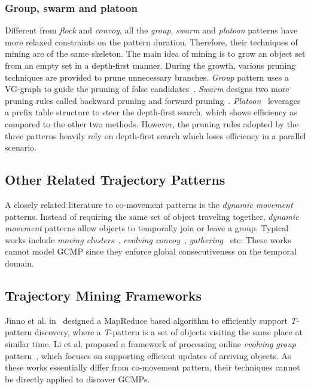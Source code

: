 \subsubsection{Group, swarm and platoon}
Different from \emph{flock} and \emph{convoy}, all the \emph{group}, \emph{swarm} and \emph{platoon}
patterns have more relaxed constraints on the pattern duration. Therefore, their techniques of mining are of
the same skeleton. The main idea of mining is to grow an object set from an empty set
in a depth-first manner. During the growth, various pruning techniques are provided to prune 
unnecessary branches. \emph{Group} pattern uses a VG-graph to guide the pruning of false candidates~\cite{wang2006grouppattern}.
\emph{Swarm} designs two more pruning rules called backward pruning and forward pruning~\cite{li2010swarm}. \emph{Platoon}~\cite{li2015platoon}
leverages a prefix table structure to steer the depth-first search, which shows efficiency 
as compared to the other two methods.
However, the pruning rules adopted by the three patterns heavily rely on depth-first search which loses efficiency in a parallel scenario.


\subsection{Other Related Trajectory Patterns}
A closely related literature to co-movement patterns is the \emph{dynamic movement} patterns. Instead of requiring the same set of object traveling together, \emph{dynamic movement} patterns allow objects to temporally join or leave a group. Typical works include \emph{moving clusters}~\cite{kalnis2005movingclusters}, \emph{evolving convoy}~\cite{aung2010discovery}, \emph{gathering}~\cite{zheng2013gathering} etc. These works cannot model GCMP since they enforce global consecutiveness on the 
temporal domain.
 
\subsection{Trajectory Mining Frameworks}
Jinno et al. in~\cite{jinno2012paralleltpattern} designed a MapReduce based algorithm to efficiently support \emph{T}-pattern discovery, where a \emph{T}-pattern is a set of objects visiting the same place at similar time. Li et al. proposed a framework of processing online \emph{evolving group} pattern~\cite{li2013onlinegroup}, which focuses on supporting efficient updates of arriving objects. 
As these works essentially differ from co-movement pattern, their techniques cannot be directly applied to discover GCMPs.